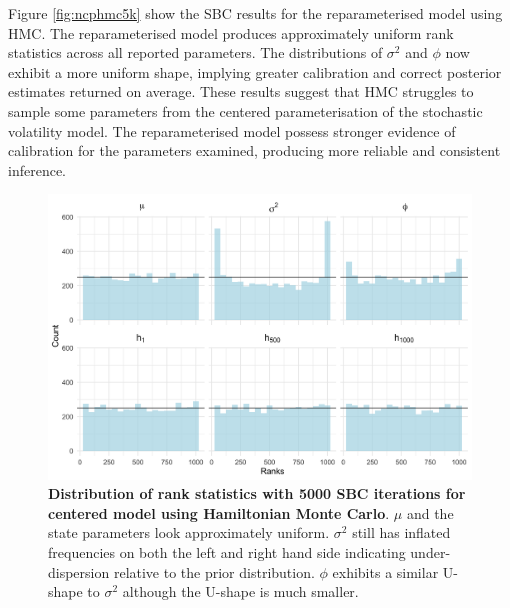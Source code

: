 \documentclass[12pt, a4paper]{article}
\begin{document}
    Figure \ref{fig:ncphmc5k} show the SBC results for the reparameterised model using HMC. The reparameterised model produces approximately uniform rank statistics across all reported parameters. The distributions of $\sigma^2$ and $\phi$ now exhibit a more uniform shape, implying greater calibration and correct posterior estimates returned on average. These results suggest that HMC struggles to sample some parameters from the centered parameterisation of the stochastic volatility model. The reparameterised model possess stronger evidence of calibration for the parameters examined, producing more reliable and consistent inference.
        \begin{figure}[H]
        \centering
        \includegraphics[scale=0.09]{results/hmc_cp_5k.png}
        \caption{\textbf{Distribution of rank statistics with 5000 SBC iterations for centered model using Hamiltonian Monte Carlo}. $\mu$ and the state parameters look approximately uniform. $\sigma^2$ still has inflated frequencies on both the left and right hand side indicating under-dispersion relative to the prior distribution. $\phi$ exhibits a similar U-shape to $\sigma^2$ although the U-shape is much smaller.}
        \label{fig:cphmc5k}
    \end{figure}
\end{document}
